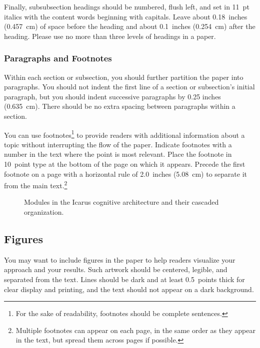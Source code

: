 \documentclass[11pt,letterpaper]{article}
\begin{document}
Finally, subsubsection headings should be numbered, flush left, and
set in 11~pt italics with the content words beginning with capitals. 
Leave about 0.18~inches (0.457~cm) of space before the heading and
about 0.1~inches (0.254~cm) after the heading. Please use no more 
than three levels of headings in a paper.

\subsubsection{Paragraphs and Footnotes}

Within each section or subsection, you should further partition 
the paper into paragraphs. You should not indent the first line 
of a section or subsection's initial paragraph, but you should
indent successive paragraphs by 0.25 inches (0.635~cm). There 
should be no extra spacing between paragraphs within a section. 
 
You can use footnotes\footnote{For the sake of readability, footnotes
should be complete sentences.} to provide readers with additional
information about a topic without interrupting the flow of the paper.
Indicate footnotes with a number in the text where the point is most
relevant. Place the footnote in 10~point type at the bottom of the
page on which it appears. Precede the first footnote on a page 
with a horizontal rule of 2.0~inches (5.08~cm) to separate it from 
the main text.\footnote{Multiple footnotes can appear on each page, 
in the same order as they appear in the text, but spread them across
pages if possible.}

\begin{figure}[h]
\vskip 0.05in
\begin{center}
\setlength{\epsfxsize}{3.5in}
\centerline{}
\caption{Modules in the {\sc Icarus} cognitive architecture and their
         cascaded organization.} 
\label{sample-figure}
\end{center}
\vskip -0.2in
\end{figure} 

\subsection{Figures}
 
You may want to include figures in the paper to help readers visualize
your approach and your results. Such artwork should be centered,
legible, and separated from the text. Lines should be dark and at
least 0.5~points thick for clear display and printing, and the text 
should not appear on a dark background.
\end{document}
